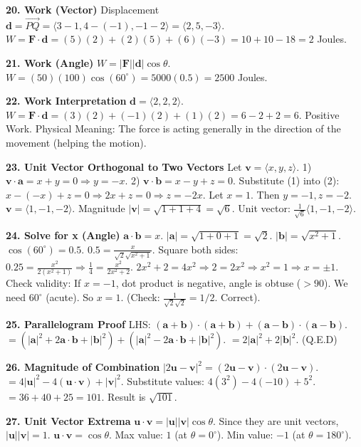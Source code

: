 \documentclass[12pt]{article}
\begin{document}
\textbf{20. Work (Vector)}
Displacement $\mathbf{d} = \vec{PQ} = \langle 3-1, 4-(-1), -1-2 \rangle = \langle 2, 5, -3 \rangle$.
$W = \mathbf{F} \cdot \mathbf{d} = (5)(2) + (2)(5) + (6)(-3) = 10 + 10 - 18 = 2$ Joules.

\textbf{21. Work (Angle)}
$W = |\mathbf{F}| |\mathbf{d}| \cos \theta$.
$W = (50)(100) \cos(60^\circ) = 5000 (0.5) = 2500$ Joules.

\textbf{22. Work Interpretation}
$\mathbf{d} = \langle 2, 2, 2 \rangle$.
$W = \mathbf{F} \cdot \mathbf{d} = (3)(2) + (-1)(2) + (1)(2) = 6 - 2 + 2 = 6$.
Positive Work.
Physical Meaning: The force is acting generally in the direction of the movement (helping the motion).

\textbf{23. Unit Vector Orthogonal to Two Vectors}
Let $\mathbf{v} = \langle x, y, z \rangle$.
1) $\mathbf{v} \cdot \mathbf{a} = x + y = 0 \Rightarrow y = -x$.
2) $\mathbf{v} \cdot \mathbf{b} = x - y + z = 0$.
Substitute (1) into (2): $x - (-x) + z = 0 \Rightarrow 2x + z = 0 \Rightarrow z = -2x$.
Let $x = 1$. Then $y = -1, z = -2$. $\mathbf{v} = \langle 1, -1, -2 \rangle$.
Magnitude $|\mathbf{v}| = \sqrt{1 + 1 + 4} = \sqrt{6}$.
Unit vector: $\frac{1}{\sqrt{6}} \langle 1, -1, -2 \rangle$.

\textbf{24. Solve for x (Angle)}
$\mathbf{a} \cdot \mathbf{b} = x$.
$|\mathbf{a}| = \sqrt{1+0+1} = \sqrt{2}$. $|\mathbf{b}| = \sqrt{x^2+1}$.
$\cos(60^\circ) = 0.5$.
$0.5 = \frac{x}{\sqrt{2}\sqrt{x^2+1}}$.
Square both sides: $0.25 = \frac{x^2}{2(x^2+1)} \Rightarrow \frac{1}{4} = \frac{x^2}{2x^2+2}$.
$2x^2 + 2 = 4x^2 \Rightarrow 2 = 2x^2 \Rightarrow x^2 = 1 \Rightarrow x = \pm 1$.
Check validity: If $x=-1$, dot product is negative, angle is obtuse ($>90$). We need $60^\circ$ (acute).
So $x = 1$. (Check: $\frac{1}{\sqrt{2}\sqrt{2}} = 1/2$. Correct).

\textbf{25. Parallelogram Proof}
LHS: $(\mathbf{a} + \mathbf{b}) \cdot (\mathbf{a} + \mathbf{b}) + (\mathbf{a} - \mathbf{b}) \cdot (\mathbf{a} - \mathbf{b})$.
$= (|\mathbf{a}|^2 + 2\mathbf{a}\cdot\mathbf{b} + |\mathbf{b}|^2) + (|\mathbf{a}|^2 - 2\mathbf{a}\cdot\mathbf{b} + |\mathbf{b}|^2)$.
$= 2|\mathbf{a}|^2 + 2|\mathbf{b}|^2$. (Q.E.D)

\textbf{26. Magnitude of Combination}
$|2\mathbf{u} - \mathbf{v}|^2 = (2\mathbf{u} - \mathbf{v}) \cdot (2\mathbf{u} - \mathbf{v})$.
$= 4|\mathbf{u}|^2 - 4(\mathbf{u} \cdot \mathbf{v}) + |\mathbf{v}|^2$.
Substitute values: $4(3^2) - 4(-10) + 5^2$.
$= 36 + 40 + 25 = 101$.
Result is $\sqrt{101}$.

\textbf{27. Unit Vector Extrema}
$\mathbf{u} \cdot \mathbf{v} = |\mathbf{u}| |\mathbf{v}| \cos \theta$.
Since they are unit vectors, $|\mathbf{u}||\mathbf{v}| = 1$.
$\mathbf{u} \cdot \mathbf{v} = \cos \theta$.
Max value: $1$ (at $\theta = 0^\circ$).
Min value: $-1$ (at $\theta = 180^\circ$).
\end{document}
